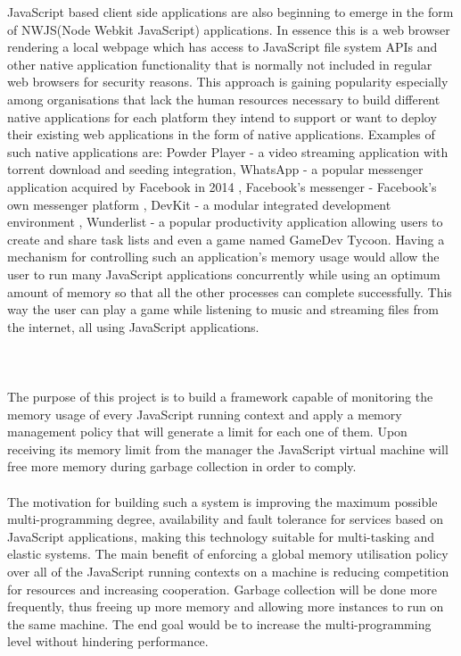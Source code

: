 \documentclass{l4proj}
\begin{document}
\hspace*{3em} JavaScript based client side applications are also beginning to emerge in the form of NWJS(Node Webkit JavaScript) applications. In essence this is a web browser rendering a local webpage which has access to JavaScript file system APIs and other native application functionality that is normally not included in regular web browsers for security reasons. This approach is gaining popularity especially among organisations that lack the human resources necessary to build different native applications for each platform they intend to support or want to deploy their existing web applications in the form of native applications. 
Examples of such native applications are: Powder Player - a video streaming application with torrent download and seeding integration\cite{powderplayer}, WhatsApp - a popular messenger application acquired by Facebook in 2014 \cite{whatsap}, Facebook’s messenger - Facebook's own messenger platform \cite{messenger}, DevKit - a modular integrated development environment \cite{devkit},
Wunderlist - a popular productivity application allowing users to create and share task lists\cite{wunderlist} and even a game named GameDev Tycoon\cite{tycoongame}. 
Having a mechanism for controlling such an application's memory usage would allow the user to run many JavaScript applications concurrently while using an optimum amount of memory so that all the other processes can complete successfully. This way the user can play a game while listening to music and streaming files from the internet, all using JavaScript applications.
\\\\
\\\\%
\hspace*{3em} The purpose of this project is to build a framework capable of monitoring the memory usage of every JavaScript running context and apply a memory management policy that will generate a limit for each one of them. Upon receiving its memory limit from the manager the JavaScript virtual machine will free more memory during garbage collection in order to comply.
\\\\ %
\hspace*{3em} The motivation for building such a system is improving the maximum possible multi-programming degree, availability and fault tolerance for services based on JavaScript applications, making this technology suitable for multi-tasking and elastic systems. The main benefit of enforcing a global memory utilisation policy over all of the JavaScript running contexts on a machine is reducing competition for resources and increasing cooperation. Garbage collection will be done more frequently, thus freeing up more memory and allowing more instances to run on the same machine. The end goal would be to increase the multi-programming level without hindering performance.\\
\end{document}

